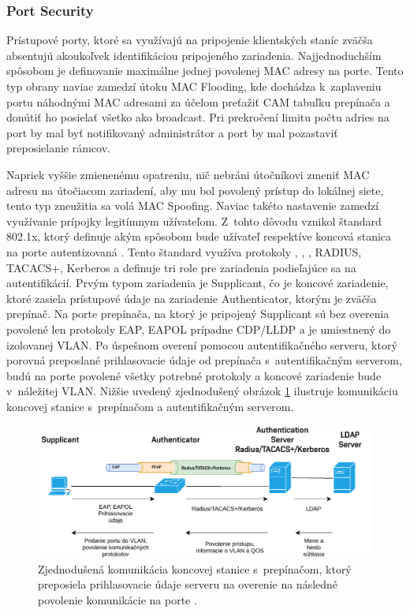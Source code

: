 \subsubsection{Port Security}
Prístupové porty, ktoré sa využívajú na pripojenie klientských staníc zväčša absentujú akoukoľvek identifikáciou pripojeného zariadenia. Najjednoduchším spôsobom je definovanie maximálne jednej povolenej MAC adresy na porte. Tento typ obrany naviac zamedzí útoku MAC Flooding, kde dochádza k~zaplaveniu portu náhodnými MAC adresami za účelom preťažiť CAM tabuľku prepínača a donútiť ho posielať všetko ako broadcast. Pri prekročení limitu počtu adries na port by mal byť notifikovaný administrátor a port by mal pozastaviť preposielanie rámcov.

Napriek vyššie zmienenému opatreniu, nič nebráni útočníkovi zmeniť MAC adresu na útočiacom zariadení, aby mu bol povolený prístup do lokálnej siete, tento typ zneužitia sa volá MAC Spoofing. Naviac takéto nastavenie zamedzí využívanie prípojky legitímnym užívateľom. Z~tohto dôvodu vznikol štandard 802.1x, ktorý definuje akým spôsobom bude užívateľ respektíve koncová stanica na porte autentizovaná \cite{Vyncke2008}. Tento štandard využíva protokoly , , , RADIUS, TACACS+, Kerberos a definuje tri role pre zariadenia podieľajúce sa na autentifikácií. Prvým typom zariadenia je Supplicant, čo je koncové zariadenie, ktoré zasiela prístupové údaje na zariadenie Authenticator, ktorým je zväčša prepínač. Na porte prepínača, na ktorý je pripojený Supplicant sú bez overenia povolené len protokoly EAP, EAPOL prípadne CDP/LLDP a je umiestnený do izolovanej VLAN. Po úspešnom overení pomocou autentifikačného serveru, ktorý porovná preposlané prihlasovacie údaje od prepínača s~autentifikačným serverom, budú na porte povolené všetky potrebné protokoly a koncové zariadenie bude v~náležitej VLAN. Nižšie uvedený zjednodušený obrázok \ref{fig:dot1x} ilustruje komunikáciu koncovej stanice s~prepínačom a autentifikačným serverom.  

\begin{figure}[H]
	\begin{center}
		\includegraphics[scale=0.75]{obrazky/dot1x.pdf}
	\end{center}
	\caption[Zjednodušený popis autentifikácie 802.1x]{Zjednodušená komunikácia koncovej stanice s~prepínačom, ktorý preposiela prihlasovacie údaje serveru na overenie na následné povolenie komunikácie na porte \cite{Vyncke2008}.}
	\label{fig:dot1x}
\end{figure}


